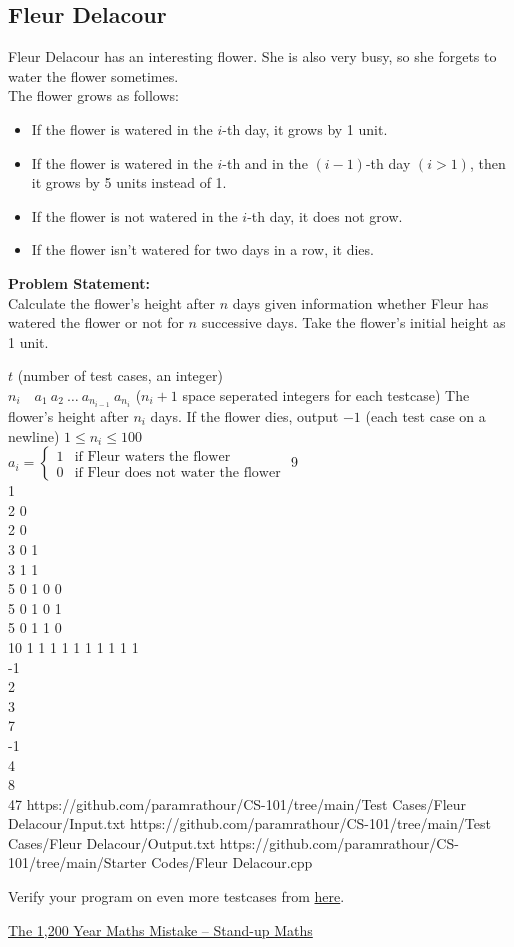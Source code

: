 \documentclass[../../Problems]{subfiles}
\begin{document}
\subsection{Fleur Delacour}
Fleur Delacour has an interesting flower. She is also very busy, so  she forgets to water the flower sometimes.\\
The flower grows as follows:
\vspace{-0.5em}
\begin{itemize}
\item If the flower is watered in the $i$-th day, it grows by 1 unit.
\item If the flower is watered in the $i$-th and in the $(i-1)$-th day $(i>1)$, then it grows by 5 units instead of 1.
\item If the flower is not watered in the $i$-th day, it does not grow.
\item If the flower isn't watered for two days in a row, it dies.
\end{itemize}
\textbf{Problem Statement:}\\
Calculate the flower's height after $n$ days given information whether Fleur has watered the flower or not for $n$ successive days. Take the flower's initial height as 1 unit.
\vspace{-0.5em}
\begin{testcasesMore}
	{$t$ \hfill(number of test cases, an integer)\\
	$n_i\quad a_{1}\ a_{2}\ \ldots\ a_{n_{i-1}}\ a_{n_i}$ \hfill($n_i+1$ space seperated integers for each testcase)}
	{The flower's height after $n_i$ days. If the flower dies, output $-1$ \hfill(each test case on a newline)}
	{$1 \leq n_i \leq 100$\\[0.5em]
	$
	a_i = \begin{cases} 
      1 & \text{if Fleur waters the flower}\\
      0 & \text{if Fleur does not water the flower}
   \end{cases}
	$}
	{9\\1\\2 0\\2 0\\3 0 1\\3 1 1\\5 0 1 0 0\\5 0 1 0 1\\5 0 1 1 0\\10 1 1 1 1 1 1 1 1 1}
	{1\\-1\\2\\3\\7\\-1\\4\\8\\47}
	{https://github.com/paramrathour/CS-101/tree/main/Test Cases/Fleur Delacour/Input.txt}
	{https://github.com/paramrathour/CS-101/tree/main/Test Cases/Fleur Delacour/Output.txt}
	{https://github.com/paramrathour/CS-101/tree/main/Starter Codes/Fleur Delacour.cpp}
\end{testcasesMore}
\begin{note}
	Verify your program on even more testcases from \href{https://codeforces.com/problemset/problem/1585/A}{here}.
\end{note}
\begin{funvideo}
\href{https://youtu.be/FAdmpAZTH_M}{The 1,200 Year Maths Mistake -- Stand-up Maths}
\end{funvideo}
\end{document}
